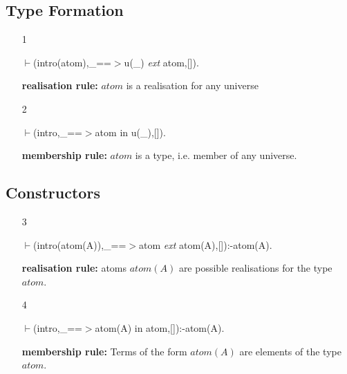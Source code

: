 \documentclass[11pt]{report}
\begin{document}
 \subsection{Type Formation}
  
 \begin{enumerate}
 \item[1] 
\begin{sf}\begin{tabbing}
$\vdash$(intro(atom),\_\hspace{0.1em}==$>$u(\_\hspace{0.1em}) \mbox{\it ext} atom,[]).
\end{tabbing}\end{sf}

 {\bf realisation rule:} 
 $atom$ is a realisation for any universe
  
 \item[2] 
\begin{sf}\begin{tabbing}
$\vdash$(intro,\_\hspace{0.1em}==$>$atom in u(\_\hspace{0.1em}),[]).
\end{tabbing}\end{sf}

 {\bf membership rule:} 
 $atom$ is a type, i.e. member of any universe.
 \end{enumerate}
  
 \subsection{Constructors}
  
 \begin{enumerate}
 \item[3] 
\begin{sf}\begin{tabbing}
$\vdash$(intro(atom(A)),\_\hspace{0.1em}==$>$atom \mbox{\it ext} atom(A),[]):-atom(A).
\end{tabbing}\end{sf}

 {\bf realisation rule:} 
 atoms $atom(A)$ are possible realisations for the type $atom$.
  
 \item[4] 
\begin{sf}\begin{tabbing}
$\vdash$(intro,\_\hspace{0.1em}==$>$atom(A) in atom,[]):-atom(A).
\end{tabbing}\end{sf}

 {\bf membership rule:} 
 Terms of the form $atom(A)$ are elements of the type $atom$.
 \end{enumerate}
  
\end{document}
